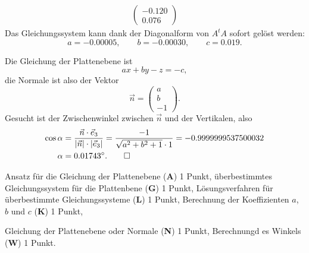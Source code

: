 \begin{loesung}
\begin{teilaufgaben}
\begin{align*}
\begin{pmatrix}
-0.120\\
0.076
\end{pmatrix}
\end{align*}
Das Gleichungssystem kann dank der Diagonalform von $A^tA$
sofort gelöst werden:
\[
a=-0.00005,\qquad b=-0.00030,\qquad c=0.019.
\]
\item
Die Gleichung der Plattenebene ist
\[
ax+by-z=-c,
\]
die Normale ist also der Vektor
\[
\vec n=\begin{pmatrix}a\\b\\-1\end{pmatrix}.
\]
Gesucht ist der Zwischenwinkel zwischen $\vec n$ und der Vertikalen,
also
\begin{align*}
\cos\alpha&=\frac{\vec n\cdot\vec e_3}{|\vec n|\cdot|\vec e_3|}
=\frac{-1}{\sqrt{a^2+b^2+1}\cdot 1}
=-0.9999999537500032\\
\alpha&=0.01743^\circ.
\qedhere
\end{align*}
\end{teilaufgaben}
\end{loesung}

\begin{bewertung}
\begin{teilaufgaben}
\item
Ansatz für die Gleichung der Plattenebene (\textbf{A}) 1 Punkt,
überbestimmtes Gleichungssystem für die Plattenbene (\textbf{G}) 1 Punkt,
Lösungsverfahren für überbestimmte Gleichungssysteme (\textbf{L}) 1 Punkt,
Berechnung der Koeffizienten $a$, $b$ und $c$ (\textbf{K}) 1 Punkt,
\item
Gleichung der Plattenebene oder Normale (\textbf{N}) 1 Punkt,
Berechnungd es Winkels (\textbf{W}) 1 Punkt.
\end{teilaufgaben}
\end{bewertung}


